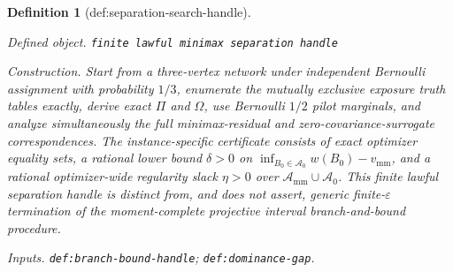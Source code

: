\documentclass{article}
\newtheorem{definition}{Definition}
\begin{document}
\begin{definition}[def:separation-search-handle]\label{def:separation-search-handle}
\par\smallskip\noindent\emph{Defined object.} \texttt{finite lawful minimax separation handle}
\par\smallskip\noindent\emph{Construction.} Start from a three-vertex network under independent Bernoulli assignment with probability \(1/3\), enumerate the mutually exclusive exposure truth tables exactly, derive exact \(\Pi\) and \(\Omega\), use Bernoulli \(1/2\) pilot marginals, and analyze simultaneously the full minimax-residual and zero-covariance-surrogate correspondences.  The instance-specific certificate consists of exact optimizer equality sets, a rational lower bound \(\delta>0\) on \(\inf_{B_0\in\mathcal A_0}w(B_0)-v_{\mathrm{mm}}\), and a rational optimizer-wide regularity slack \(\eta>0\) over \(\mathcal A_{\mathrm{mm}}\cup\mathcal A_0\).  This finite lawful separation handle is distinct from, and does not assert, generic finite-\(\varepsilon\) termination of the moment-complete projective interval branch-and-bound procedure.
\par\smallskip\noindent\emph{Inputs.} \texttt{def:\allowbreak{}branch-\allowbreak{}bound-\allowbreak{}handle}; \texttt{def:\allowbreak{}dominance-\allowbreak{}gap}.
\end{definition}
\end{document}
